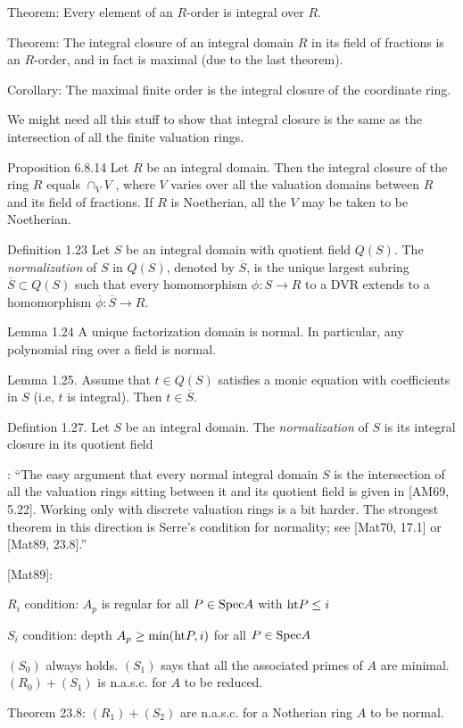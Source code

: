 Theorem: Every element of an $R$-order is integral over $R$.

Theorem: The integral closure of an integral domain $R$ in its field of fractions is an $R$-order,
and in fact is maximal (due to the last theorem).

Corollary: The maximal finite order is the integral closure of the coordinate ring.

\begin{mdframed}[backgroundcolor=yellow!20]
We might need all this stuff to show that integral closure is the same as the intersection
of all the finite valuation rings.

\cite{Swanson Huneke} Proposition 6.8.14 Let $R$ be an integral domain. Then
the integral closure of the ring $R$ equals $\cap_V V$ , where $V$
varies over all the valuation domains between $R$ and its field of
fractions. If $R$ is Noetherian, all the $V$ may be taken to be
Noetherian.

\cite{kollar} Definition 1.23
Let $S$ be an integral domain with quotient field $Q(S)$.
The {\it normalization} of $S$ in $Q(S)$, denoted by $\overline{S}$,
is the unique largest subring $\overline{S} \subset Q(S)$
such that every homomorphism $\phi: S \to R$ to a DVR
extends to a homomorphism $\overline{\phi}: \overline{S} \to R$.

\cite{kollar} Lemma 1.24
A unique factorization domain is normal.  In particular,
any polynomial ring over a field is normal.

\cite{kollar} Lemma 1.25.
Assume that $t \in Q(S)$ satisfies a monic equation
with coefficients in $S$ (i.e, $t$ is integral).
Then $t \in \overline{S}$.

\cite{kollar} Defintion 1.27.
Let $S$ be an integral domain.  The {\it normalization} of $S$
is its integral closure in its quotient field

\cite{kollar}: ``The easy argument that every normal integral domain $S$
is the intersection of all the valuation rings sitting between
it and its quotient field is given in [AM69, 5.22].  Working
only with discrete valuation rings is a bit harder.  The strongest
theorem in this direction is Serre's condition for normality;
see [Mat70, 17.1] or [Mat89, 23.8].''

[Mat89]:

$R_i$ condition: $A_p$ is regular for all $P \in {\rm Spec } A$ with ${\rm ht } P \le i$

$S_i$ condition: depth $A_p \ge {\rm min}({\rm ht } P, i)$ for all $P \in {\rm Spec } A$

$(S_0)$ always holds. $(S_1)$ says that all the associated primes of $A$ are minimal.
$(R_0)+(S_1)$ is n.a.s.c. for $A$ to be reduced.

Theorem 23.8: $(R_1)+(S_2)$ are n.a.s.c. for a Notherian ring $A$ to be normal.
\end{mdframed}

